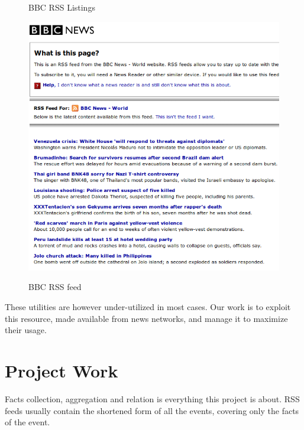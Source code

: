 \documentclass{srmreport}
\begin{document}
\begin{figure}[h]
\begin{multicols}{2}
\caption{BBC RSS Listings}\vspace{0.5em}
\includegraphics[scale=0.3]{res/rssfeeds/bbcrss}\\
\caption{BBC RSS feed}
\end{multicols}
\end{figure}
These utilities are however under-utilized in most cases. Our work is to exploit this resource, made available from news networks, and manage it to maximize their usage.

\chapter{Project Work}

Facts collection, aggregation and relation is everything this project is about. RSS feeds usually contain the shortened form of all the events, covering only the facts of the event.
\end{document}
